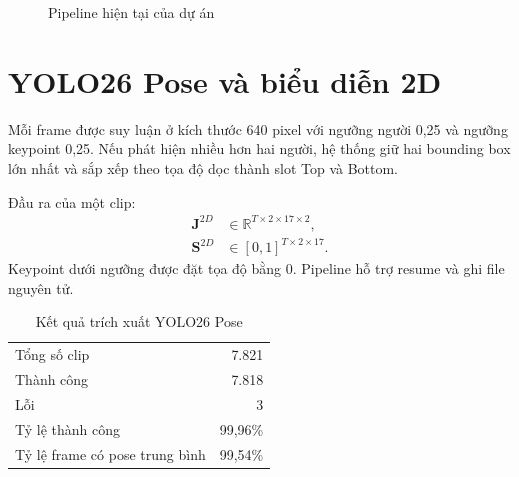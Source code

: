 \documentclass[12pt,a4paper,oneside]{report}
\newcommand{\vect}[1]{\boldsymbol{#1}}
\begin{document}
\begin{figure}[H]
\centering
{}
\caption{Pipeline hiện tại của dự án}
\end{figure}


\section{YOLO26 Pose và biểu diễn 2D}

Mỗi frame được suy luận ở kích thước 640 pixel với ngưỡng người 0,25 và ngưỡng keypoint 0,25. Nếu phát hiện nhiều hơn hai người, hệ thống giữ hai bounding box lớn nhất và sắp xếp theo tọa độ dọc thành slot Top và Bottom.

Đầu ra của một clip:
\begin{align}
\vect{J}^{2D}&\in\mathbb{R}^{T\times2\times17\times2},\\
\vect{S}^{2D}&\in[0,1]^{T\times2\times17}.
\end{align}
Keypoint dưới ngưỡng được đặt tọa độ bằng 0. Pipeline hỗ trợ resume và ghi file nguyên tử.

\begin{table}[H]
\centering
\caption{Kết quả trích xuất YOLO26 Pose}
\begin{tabular}{lr}
\toprule
Tổng số clip & 7.821\\
Thành công & 7.818\\
Lỗi & 3\\
Tỷ lệ thành công & 99,96\%\\
Tỷ lệ frame có pose trung bình & 99,54\%\\
\bottomrule
\end{tabular}
\end{table}
\end{document}
